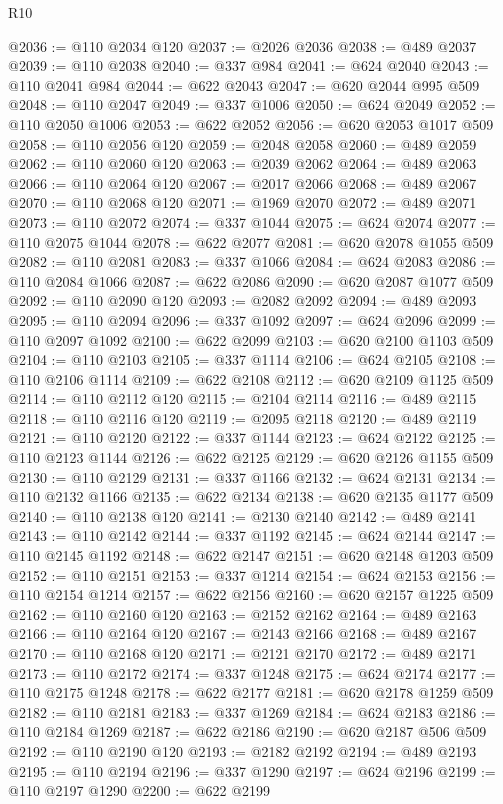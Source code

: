 \begin{lexlean}{R10}
\begin{coremodule}
{{{{{{{{{{{{{{{{{{{{{{{{{{{{{{{{{{{{{{{{{{{{{{{{{{{{{{{{{{{{{{{{{{{{{{{{{{{{{{{{{{{{@2036 := @110 @2034 @120
@2037 := @2026 @2036
@2038 := @489 @2037
@2039 := @110 @2038
@2040 := @337 @984
@2041 := @624 @2040
@2043 := @110 @2041 @984
@2044 := @622 @2043
@2047 := @620 @2044 @995 @509
@2048 := @110 @2047
@2049 := @337 @1006
@2050 := @624 @2049
@2052 := @110 @2050 @1006
@2053 := @622 @2052
@2056 := @620 @2053 @1017 @509
@2058 := @110 @2056 @120
@2059 := @2048 @2058
@2060 := @489 @2059
@2062 := @110 @2060 @120
@2063 := @2039 @2062
@2064 := @489 @2063
@2066 := @110 @2064 @120
@2067 := @2017 @2066
@2068 := @489 @2067
@2070 := @110 @2068 @120
@2071 := @1969 @2070
@2072 := @489 @2071
@2073 := @110 @2072
@2074 := @337 @1044
@2075 := @624 @2074
@2077 := @110 @2075 @1044
@2078 := @622 @2077
@2081 := @620 @2078 @1055 @509
@2082 := @110 @2081
@2083 := @337 @1066
@2084 := @624 @2083
@2086 := @110 @2084 @1066
@2087 := @622 @2086
@2090 := @620 @2087 @1077 @509
@2092 := @110 @2090 @120
@2093 := @2082 @2092
@2094 := @489 @2093
@2095 := @110 @2094
@2096 := @337 @1092
@2097 := @624 @2096
@2099 := @110 @2097 @1092
@2100 := @622 @2099
@2103 := @620 @2100 @1103 @509
@2104 := @110 @2103
@2105 := @337 @1114
@2106 := @624 @2105
@2108 := @110 @2106 @1114
@2109 := @622 @2108
@2112 := @620 @2109 @1125 @509
@2114 := @110 @2112 @120
@2115 := @2104 @2114
@2116 := @489 @2115
@2118 := @110 @2116 @120
@2119 := @2095 @2118
@2120 := @489 @2119
@2121 := @110 @2120
@2122 := @337 @1144
@2123 := @624 @2122
@2125 := @110 @2123 @1144
@2126 := @622 @2125
@2129 := @620 @2126 @1155 @509
@2130 := @110 @2129
@2131 := @337 @1166
@2132 := @624 @2131
@2134 := @110 @2132 @1166
@2135 := @622 @2134
@2138 := @620 @2135 @1177 @509
@2140 := @110 @2138 @120
@2141 := @2130 @2140
@2142 := @489 @2141
@2143 := @110 @2142
@2144 := @337 @1192
@2145 := @624 @2144
@2147 := @110 @2145 @1192
@2148 := @622 @2147
@2151 := @620 @2148 @1203 @509
@2152 := @110 @2151
@2153 := @337 @1214
@2154 := @624 @2153
@2156 := @110 @2154 @1214
@2157 := @622 @2156
@2160 := @620 @2157 @1225 @509
@2162 := @110 @2160 @120
@2163 := @2152 @2162
@2164 := @489 @2163
@2166 := @110 @2164 @120
@2167 := @2143 @2166
@2168 := @489 @2167
@2170 := @110 @2168 @120
@2171 := @2121 @2170
@2172 := @489 @2171
@2173 := @110 @2172
@2174 := @337 @1248
@2175 := @624 @2174
@2177 := @110 @2175 @1248
@2178 := @622 @2177
@2181 := @620 @2178 @1259 @509
@2182 := @110 @2181
@2183 := @337 @1269
@2184 := @624 @2183
@2186 := @110 @2184 @1269
@2187 := @622 @2186
@2190 := @620 @2187 @506 @509
@2192 := @110 @2190 @120
@2193 := @2182 @2192
@2194 := @489 @2193
@2195 := @110 @2194
@2196 := @337 @1290
@2197 := @624 @2196
@2199 := @110 @2197 @1290
@2200 := @622 @2199
}}}}}}}}}}}}}}}}}}}}}}}}}}}}}}}}}}}}}}}}}}}}}}}}}}}}}}}}}}}}}}}}}}}}}}}}}}}}}}}}}}}}
\end{coremodule}
\end{lexlean}
